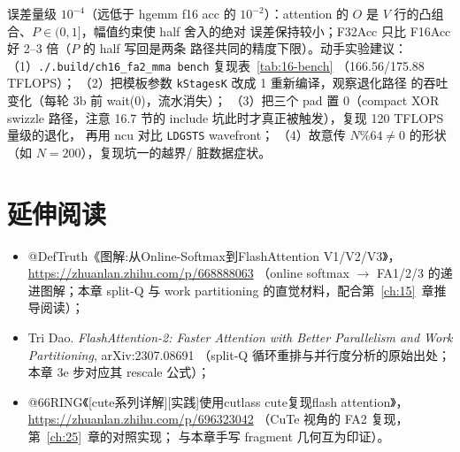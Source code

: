 误差量级 $10^{-4}$（远低于 hgemm f16 acc 的 $10^{-2}$）：attention
的 $O$ 是 $V$ 行的凸组合、$P\in(0,1]$，幅值约束使 half 舍入的绝对
误差保持较小；F32Acc 只比 F16Acc 好 2--3 倍（$P$ 的 half 写回是两条
路径共同的精度下限）。动手实验建议：
（1）\texttt{.\allowbreak{}/\allowbreak{}.\allowbreak{}build/\allowbreak{}ch16\_\allowbreak{}fa2\_\allowbreak{}mma bench} 复现表~\ref{tab:16-bench}
（166.56/175.88 TFLOPS）；
（2）把模板参数 \texttt{kStagesK} 改成 1 重新编译，观察退化路径
的吞吐变化（每轮 3b 前 wait(0)，流水消失）；
（3）把三个 pad 置 0（compact XOR swizzle 路径，注意 16.7 节的
include 坑此时才真正被触发），复现 120 TFLOPS 量级的退化，
再用 ncu 对比 \texttt{LDGSTS} wavefront；
（4）故意传 $N\%64\neq0$ 的形状（如 $N{=}200$），复现坑一的越界/
脏数据症状。

\section*{延伸阅读}

\begin{itemize}
  \item @DefTruth《图解:从Online-Softmax到FlashAttention V1/V2/V3》，
        \url{https://zhuanlan.zhihu.com/p/668888063}
        （online softmax $\to$ FA1/2/3 的递进图解；本章 split-Q 与
        work partitioning 的直觉材料，配合第~\ref{ch:15}~章推导阅读）；
  \item Tri Dao. \emph{FlashAttention-2: Faster Attention with Better
        Parallelism and Work Partitioning}, arXiv:2307.08691
        （split-Q 循环重排与并行度分析的原始出处；本章 3e 步对应其
        rescale 公式）；
  \item @66RING《[cute系列详解][实践]使用cutlass cute复现flash attention》，
        \url{https://zhuanlan.zhihu.com/p/696323042}
        （CuTe 视角的 FA2 复现，第~\ref{ch:25}~章的对照实现；
        与本章手写 fragment 几何互为印证）。
\end{itemize}
